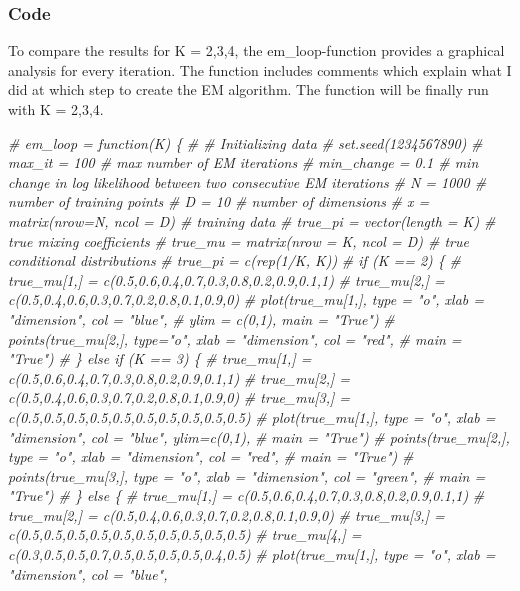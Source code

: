 \documentclass[]{article}
\newenvironment{Shaded}{\begin{snugshade}}{\end{snugshade}}
\newcommand{\CommentTok}[1]{\textcolor[rgb]{0.56,0.35,0.01}{\textit{#1}}}
\begin{document}
\subsubsection{Code}\label{code}

To compare the results for K = 2,3,4, the em\_loop-function provides a
graphical analysis for every iteration. The function includes comments
which explain what I did at which step to create the EM algorithm. The
function will be finally run with K = 2,3,4.

\begin{Shaded}
\begin{Highlighting}[]
\CommentTok{# em_loop = function(K) \{}
\CommentTok{# # Initializing data}
\CommentTok{# set.seed(1234567890)}
\CommentTok{# max_it = 100 # max number of EM iterations}
\CommentTok{# min_change = 0.1 # min change in log likelihood between two consecutive EM iterations}
\CommentTok{# N = 1000 # number of training points}
\CommentTok{# D = 10 # number of dimensions}
\CommentTok{# x = matrix(nrow=N, ncol = D) # training data}
\CommentTok{# true_pi = vector(length = K) # true mixing coefficients}
\CommentTok{# true_mu = matrix(nrow = K, ncol = D) # true conditional distributions}
\CommentTok{# true_pi = c(rep(1/K, K))}
\CommentTok{# if (K == 2) \{}
\CommentTok{# true_mu[1,] = c(0.5,0.6,0.4,0.7,0.3,0.8,0.2,0.9,0.1,1)}
\CommentTok{# true_mu[2,] = c(0.5,0.4,0.6,0.3,0.7,0.2,0.8,0.1,0.9,0)}
\CommentTok{# plot(true_mu[1,], type = "o", xlab = "dimension", col = "blue",}
\CommentTok{# ylim = c(0,1), main = "True")}
\CommentTok{# points(true_mu[2,], type="o", xlab = "dimension", col = "red",}
\CommentTok{# main = "True")}
\CommentTok{# \} else if (K == 3) \{}
\CommentTok{# true_mu[1,] = c(0.5,0.6,0.4,0.7,0.3,0.8,0.2,0.9,0.1,1)}
\CommentTok{# true_mu[2,] = c(0.5,0.4,0.6,0.3,0.7,0.2,0.8,0.1,0.9,0)}
\CommentTok{# true_mu[3,] = c(0.5,0.5,0.5,0.5,0.5,0.5,0.5,0.5,0.5,0.5)}
\CommentTok{# plot(true_mu[1,], type = "o", xlab = "dimension", col = "blue", ylim=c(0,1),}
\CommentTok{# main = "True")}
\CommentTok{# points(true_mu[2,], type = "o", xlab = "dimension", col = "red",}
\CommentTok{# main = "True")}
\CommentTok{# points(true_mu[3,], type = "o", xlab = "dimension", col = "green",}
\CommentTok{# main = "True")}
\CommentTok{# \} else \{}
\CommentTok{# true_mu[1,] = c(0.5,0.6,0.4,0.7,0.3,0.8,0.2,0.9,0.1,1)}
\CommentTok{# true_mu[2,] = c(0.5,0.4,0.6,0.3,0.7,0.2,0.8,0.1,0.9,0)}
\CommentTok{# true_mu[3,] = c(0.5,0.5,0.5,0.5,0.5,0.5,0.5,0.5,0.5,0.5)}
\CommentTok{# true_mu[4,] = c(0.3,0.5,0.5,0.7,0.5,0.5,0.5,0.5,0.4,0.5)}
\CommentTok{# plot(true_mu[1,], type = "o", xlab = "dimension", col = "blue",}

\end{Highlighting}
\end{Shaded}
\end{document}

